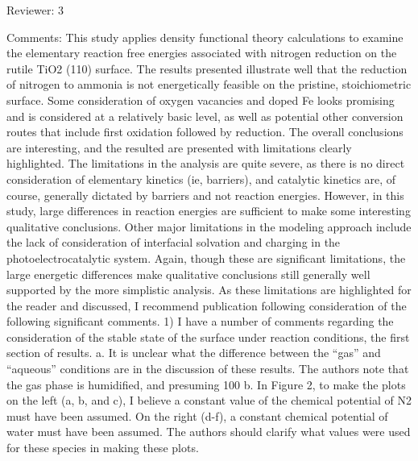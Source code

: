 Reviewer: 3

Comments:
This study applies density functional theory calculations to examine the elementary reaction free energies associated with nitrogen reduction on the rutile TiO2 (110) surface.  The results presented illustrate well that the reduction of nitrogen to ammonia is not energetically feasible on the pristine, stoichiometric surface.  Some consideration of oxygen vacancies and doped Fe looks promising and is considered at a relatively basic level, as well as potential other conversion routes that include first oxidation followed by reduction.  The overall conclusions are interesting, and the resulted are presented with limitations clearly highlighted.  The limitations in the analysis are quite severe, as there is no direct consideration of elementary kinetics (ie, barriers), and catalytic kinetics are, of course, generally dictated by barriers and not reaction energies.  However, in this study, large differences in reaction energies are sufficient to make some interesting qualitative conclusions.  Other major limitations in the modeling approach include the lack of consideration of interfacial solvation and charging in the photoelectrocatalytic system.  Again, though these are significant limitations, the large energetic differences make qualitative conclusions still generally well supported by the more simplistic analysis. As these limitations are highlighted for the reader and discussed, I recommend publication following consideration of the following significant comments.
1)       I have a number of comments regarding the consideration of the stable state of the surface under reaction conditions, the first section of results.
a.      It is unclear what the difference between the “gas” and “aqueous” conditions are in the discussion of these results.  The authors note that the gas phase is humidified, and presuming 100%
b.      In Figure 2, to make the plots on the left (a, b, and c), I believe a constant value of the chemical potential of N2 must have been assumed.  On the right (d-f), a constant chemical potential of water must have been assumed.  The authors should clarify what values were used for these species in making these plots.
